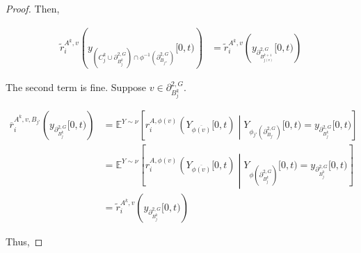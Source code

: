 \documentclass[12pt]{article}
\newcommand{\mb}{\mathbb}
\newcommand{\ov}{\overline}
\newcommand{\exmu}[2]{\mb{E}^{#1}\left[#2\right]}	%
\newcommand{\dgneigh}[2]{\partial^{2,#1}_{#2}}		%
\newcommand{\cl}[1]{\ov{#1}}						%
\newcommand{\indx}[1]{^{#1}}						%
\newcommand{\rate}{r}								%
\newcommand{\xg}{y}									%
\newcommand{\vind}[1]{_{#1}}						%
\newcommand{\tmi}[1]{#1}							%
\newcommand{\stpara}[1]{_{#1}}						%
\newcommand{\gvpara}[2]{^{#1,#2}}					%
\newcommand{\Xg}{Y}									%
\newcommand{\brate}{\alt{\rate}}					%
\newcommand{\alt}[1]{\tilde{#1}}					%
\newcommand{\mm}{\nu}								%
\newcommand{\bgrate}{\ov{\rate}}					%
\newcommand{\gvjpara}[3]{^{#1,#2,#3}}				%
\begin{document}
\begin{proof}
Then, 

\begin{align*}
\brate\gvpara{A\indx{k}}{v}\stpara{i}\left(\xg\vind{\left(C_j\indx{k}\cup\dgneigh{G}{B_j\indx{k}}\right)\cap\phi^{-1}(\dgneigh{G}{B_{j''}})}\tmi{[0,t)}\right) &= \brate\gvpara{A\indx{k}}{v}\stpara{i}\left(\xg\vind{\dgneigh{G}{B_{j(v)}\indx{k+1}}}\tmi{[0,t)}\right)
\end{align*}

The second term is fine. Suppose \(v \in \dgneigh{G}{B_j\indx{k}}\).

\begin{align*}
\bgrate\gvjpara{A\indx{k}}{v}{B_{j'}}\stpara{i}\left(\xg\vind{\dgneigh{G}{B_j\indx{k}}}\tmi{[0,t)}\right) &= \exmu{\Xg\sim\mm}{\rate\gvpara{A}{\phi(v)}\stpara{i}(\Xg\vind{\cl{\phi(v)}}\tmi{[0,t)}\middle|\Xg\vind{\phi_{j'}(\dgneigh{G}{B_{j'}})}\tmi{[0,t)} = \xg\vind{\dgneigh{G}{B_j\indx{k}}}\tmi{[0,t)}}\\
&= \exmu{\Xg\sim\mm}{\rate\gvpara{A}{\phi(v)}\stpara{i}(\Xg\vind{\cl{\phi(v)}}\tmi{[0,t)}\middle|\Xg\vind{\phi(\dgneigh{G}{B_j\indx{k}})}\tmi{[0,t)} = \xg\vind{\dgneigh{G}{B_j\indx{k}}}\tmi{[0,t)}}\\
&= \brate\gvpara{A\indx{k}}{v}\stpara{i}\left(\xg\vind{\dgneigh{G}{B_j\indx{k}}}\tmi{[0,t)}\right)
\end{align*}

Thus,


\end{proof}
\end{document}
